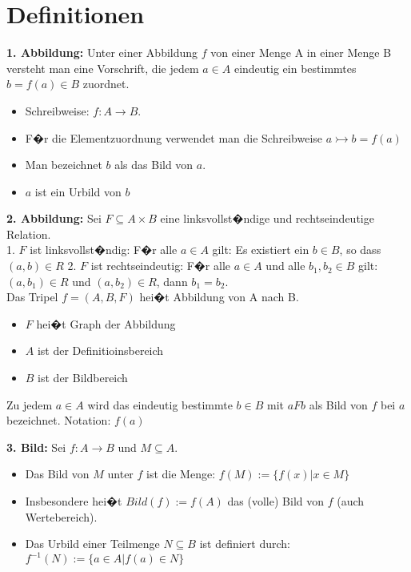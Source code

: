 \section*{Definitionen}
\textbf{1. Abbildung:} Unter einer Abbildung $f$ von einer Menge A in einer Menge B versteht man eine Vorschrift, die jedem $a \in A$ eindeutig ein bestimmtes $b = f(a) \in B$ zuordnet.
\begin{itemize}
  \setlength\itemsep{-0.05cm}
  \item Schreibweise: $f : A \rightarrow B$.
  \item F�r die Elementzuordnung verwendet man die Schreibweise $a \rightarrowtail b = f(a)$
  \item Man bezeichnet $b$ als das Bild von $a$.
  \item $a$ ist ein Urbild von $b$
\end{itemize}

\textbf{2. Abbildung:} Sei $F \subseteq A \times B$ eine linksvollst�ndige und rechtseindeutige Relation.\\
1. $F$ ist linksvollst�ndig: F�r alle $a \in A$ gilt: Es existiert ein $b \in B$, so dass $(a,b) \in R$
2. $F$ ist rechtseindeutig: F�r alle $a \in A$ und alle $b_1, b_2 \in B$ gilt: $(a,b_1) \in R$ und $(a,b_2) \in R$, dann $b_1 = b_2$.\\
Das Tripel $f = (A,B,F)$ hei�t Abbildung von A nach B.
\begin{itemize}
  \item $F$ hei�t Graph der Abbildung
  \item $A$ ist der Definitioinsbereich
  \item $B$ ist der Bildbereich
\end{itemize}
Zu jedem $a \in A$ wird das eindeutig bestimmte $b \in B$ mit $aFb$ als Bild von $f$ bei $a$ bezeichnet. Notation: $f(a)$

\textbf{3. Bild:} Sei $f : A \rightarrow B$ und $M \subseteq A$.
\begin{itemize}
  \item Das Bild von $M$ unter $f$ ist die Menge: $f(M) := \{f(x) | x \in M\}$
  \item Insbesondere hei�t $Bild(f) := f(A)$ das (volle) Bild von $f$ (auch Wertebereich). 
  \item Das Urbild einer Teilmenge $N \subseteq B$ ist definiert durch: $f^{-1}(N) := \{a\in A | f(a) \in N\}$
\end{itemize}


